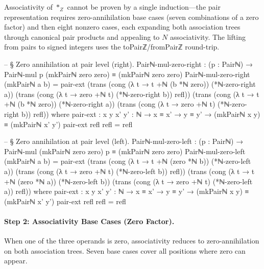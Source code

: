 \documentclass[11pt,a4paper]{book}
\def\mathbb#1{#1}%
\def\texttt#1{#1}%
\begin{document}
Associativity of $*_{\mathbb{Z}}$ cannot be proven by a single induction---the pair representation requires zero-annihilation base cases (seven combinations of a zero factor) and then eight nonzero cases, each expanding both association trees through canonical pair products and appealing to $\mathbb{N}$ associativity.
The lifting from pairs to signed integers uses the \texttt{toPairℤ}/\texttt{fromPairℤ} round-trip.

\begin{code}
-- § Zero annihilation at pair level (right).
Pairℕ-mul-zero-right : (p : Pairℕ) → Pairℕ-mul p (mkPairℕ zero zero) ≡ (mkPairℕ zero zero)
Pairℕ-mul-zero-right (mkPairℕ a b) =
  pair-ext
    (trans
      (cong (λ t → t +ℕ (b *ℕ zero)) (*ℕ-zero-right a))
      (trans
        (cong (λ t → zero +ℕ t) (*ℕ-zero-right b))
        refl))
    (trans
      (cong (λ t → t +ℕ (b *ℕ zero)) (*ℕ-zero-right a))
      (trans
        (cong (λ t → zero +ℕ t) (*ℕ-zero-right b))
        refl))
  where
    pair-ext : {x y x' y' : ℕ} → x ≡ x' → y ≡ y' → (mkPairℕ x y) ≡ (mkPairℕ x' y')
    pair-ext refl refl = refl

-- § Zero annihilation at pair level (left).
Pairℕ-mul-zero-left : (p : Pairℕ) → Pairℕ-mul (mkPairℕ zero zero) p ≡ (mkPairℕ zero zero)
Pairℕ-mul-zero-left (mkPairℕ a b) =
  pair-ext
    (trans
      (cong (λ t → t +ℕ (zero *ℕ b)) (*ℕ-zero-left a))
      (trans
        (cong (λ t → zero +ℕ t) (*ℕ-zero-left b))
        refl))
    (trans
      (cong (λ t → t +ℕ (zero *ℕ a)) (*ℕ-zero-left b))
      (trans
        (cong (λ t → zero +ℕ t) (*ℕ-zero-left a))
        refl))
  where
    pair-ext : {x y x' y' : ℕ} → x ≡ x' → y ≡ y' → (mkPairℕ x y) ≡ (mkPairℕ x' y')
    pair-ext refl refl = refl
\end{code}

\paragraph{Step 2: Associativity Base Cases (Zero Factor).}
When one of the three operands is zero, associativity reduces to
zero-annihilation on both association trees. Seven base cases cover
all positions where zero can appear.
\end{document}
